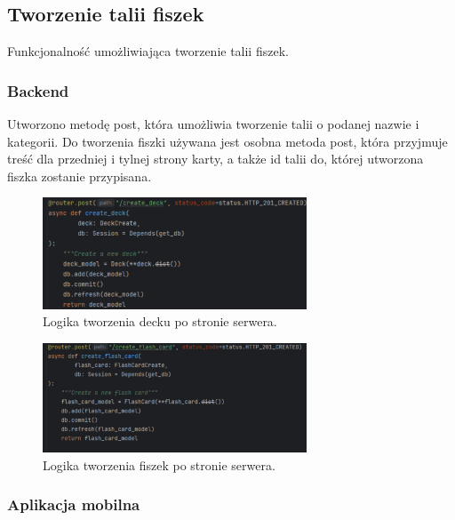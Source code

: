 \subsection{Tworzenie talii fiszek}

Funkcjonalność umożliwiająca tworzenie talii fiszek.

\subsubsection{Backend}

Utworzono metodę post, która umożliwia tworzenie talii o podanej nazwie i kategorii. Do tworzenia fiszki używana jest osobna metoda post, która przyjmuje treść dla przedniej i tylnej strony karty, a także id talii do, której utworzona fiszka zostanie przypisana.

\begin{figure}[H]
    \centering
    \includegraphics[width=0.7\textwidth]{chapters/chapter_8/screens/create_deck_backend}
    \caption{Logika tworzenia decku po stronie serwera.}
    \label{img:create_deck_backend}
\end{figure}

\begin{figure}[H]
    \centering
    \includegraphics[width=0.7\textwidth]{chapters/chapter_8/screens/create_flash_card_backend}
    \caption{Logika tworzenia fiszek po stronie serwera.}
    \label{img:create_flash_card_backend}
\end{figure}

\subsubsection{Aplikacja mobilna}


